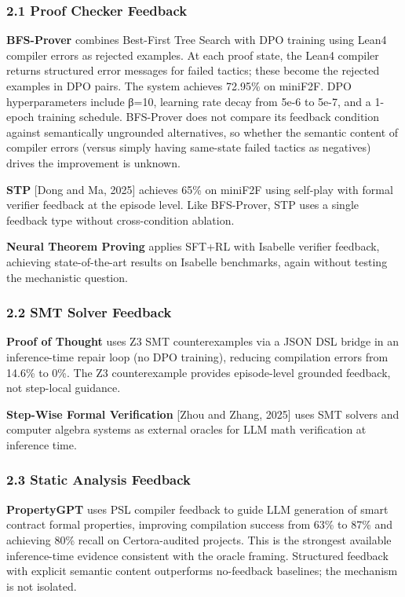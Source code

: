 
\subsubsection{2.1 Proof Checker Feedback}

\textbf{BFS-Prover} \citep{Xinetal2025} combines Best-First Tree Search with DPO training using Lean4 compiler errors as rejected examples. At each proof state, the Lean4 compiler returns structured error messages for failed tactics; these become the rejected examples in DPO pairs. The system achieves 72.95\% on miniF2F. DPO hyperparameters include β=10, learning rate decay from 5e-6 to 5e-7, and a 1-epoch training schedule. BFS-Prover does not compare its feedback condition against semantically ungrounded alternatives, so whether the semantic content of compiler errors (versus simply having same-state failed tactics as negatives) drives the improvement is unknown.

\textbf{STP} [Dong and Ma, 2025] achieves 65\% on miniF2F using self-play with formal verifier feedback at the episode level. Like BFS-Prover, STP uses a single feedback type without cross-condition ablation.

\textbf{Neural Theorem Proving} \citep{Raoetal2025} applies SFT+RL with Isabelle verifier feedback, achieving state-of-the-art results on Isabelle benchmarks, again without testing the mechanistic question.

\subsubsection{2.2 SMT Solver Feedback}

\textbf{Proof of Thought} \citep{Gangulyetal2024} uses Z3 SMT counterexamples via a JSON DSL bridge in an inference-time repair loop (no DPO training), reducing compilation errors from 14.6\% to 0\%. The Z3 counterexample provides episode-level grounded feedback, not step-local guidance.

\textbf{Step-Wise Formal Verification} [Zhou and Zhang, 2025] uses SMT solvers and computer algebra systems as external oracles for LLM math verification at inference time.

\subsubsection{2.3 Static Analysis Feedback}

\textbf{PropertyGPT} \citep{Liuetal2024} uses PSL compiler feedback to guide LLM generation of smart contract formal properties, improving compilation success from 63\% to 87\% and achieving 80\% recall on Certora-audited projects. This is the strongest available inference-time evidence consistent with the oracle framing. Structured feedback with explicit semantic content outperforms no-feedback baselines; the mechanism is not isolated.

